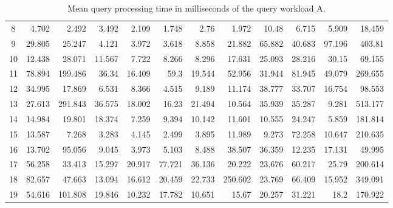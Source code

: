 \begin{table}[!th]
{\begin{tabular}{|c|r|r|r|r|r|r|r|r|r|r|r|}
			8  & 4.702   & 2.492   & 3.492  & 2.109  & 1.748  & 2.76   & 1.972   & 10.48  & 6.715   & 5.909  & 18.459  \\
			9  & 29.805  & 25.247  & 4.121  & 3.972  & 3.618  & 8.858  & 21.882  & 65.882 & 40.683  & 97.196 & 403.81  \\
			10 & 12.438  & 28.071  & 11.567 & 7.722  & 8.266  & 8.296  & 17.631  & 25.093 & 28.216  & 30.15  & 69.155  \\
			11 & 78.894  & 199.486 & 36.34  & 16.409 & 59.3   & 19.544 & 52.956  & 31.944 & 81.945  & 49.079 & 269.655 \\
			12 & 34.995  & 17.869  & 6.531  & 8.366  & 4.515  & 9.189  & 11.174  & 38.777 & 33.707  & 16.754 & 98.553  \\
			13 & 27.613  & 291.843 & 36.575 & 18.002 & 16.23  & 21.494 & 10.564  & 35.939 & 35.287  & 9.281  & 513.177 \\
			14 & 14.984  & 19.801  & 18.374 & 7.259  & 9.394  & 10.142 & 11.601  & 10.555 & 24.247  & 5.859  & 181.814 \\
			15 & 13.587  & 7.268   & 3.283  & 4.145  & 2.499  & 3.895  & 11.989  & 9.273  & 72.258  & 10.647 & 210.635 \\
			16 & 13.702  & 95.056  & 9.045  & 3.973  & 5.103  & 8.488  & 38.507  & 36.359 & 12.235  & 17.131 & 49.995  \\
			17 & 56.258  & 33.413  & 15.297 & 20.917 & 77.721 & 36.136 & 20.222  & 23.676 & 60.217  & 25.79  & 200.614 \\
			18 & 82.657  & 47.663  & 13.094 & 16.612 & 20.459 & 22.733 & 250.602 & 23.769 & 66.409  & 15.952 & 349.091 \\
			19 & 54.616  & 101.808 & 19.846 & 10.232 & 17.782 & 10.651 & 15.67   & 20.257 & 31.221  & 18.2   & 170.922 \\ \hline
		\end{tabular}%
	}
	\caption{Mean query processing time in milliseconds of the query workload A.}
	\label{tab:benchmark_A}
\end{table}
